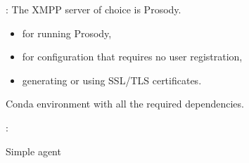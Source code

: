 \begin{frame}{\insertsection: \insertsubsection}
    \onslide<+->
    The \ac{XMPP} server of choice is Prosody.
    \hfill\href{https://prosody.im}{\faExternalLink}

    \begin{itemize}
        \item {} for running Prosody,
        \hfill\href{https://prosody.im}{\faExternalLink}

        \item {} for configuration that requires no user registration,
        \hfill\href{https://prosody.im}{\faExternalLink}

        \item generating or using SSL/TLS certificates.
        \hfill\href{https://prosody.im/doc/certificates}{\faExternalLink}
    \end{itemize}

    \bigskip
    Conda environment with all the required dependencies.
    \hfill\href{https://github.com/AILab-FOI/MAGO/blob/main/Deliverables/Phase\%201/Implementation/env.yml}{\faExternalLink}
\end{frame}

\begin{frame}[fragile]{\insertsection: \insertsubsection}
    \begin{listing}
    \caption{Simple agent}
    \end{listing}
\end{frame}


\begin{frame}{\insertsection}
\end{frame}

